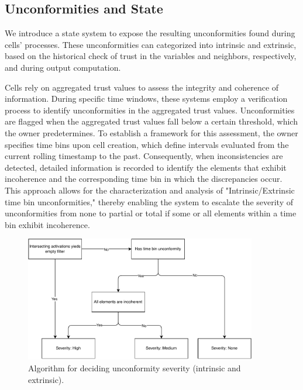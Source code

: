 \subsection{Unconformities and State} \label{sec:states}

We introduce a state system to expose the resulting unconformities found during cells' processes. These unconformities can categorized into intrinsic and extrinsic, based on the historical check of trust in the variables and neighbors, respectively, and during output computation.

Cells rely on aggregated trust values to assess the integrity and coherence of information. During specific time windows, these systems employ a verification process to identify unconformities in the aggregated trust values. Unconformities are flagged when the aggregated trust values fall below a certain threshold, which the owner predetermines. To establish a framework for this assessment, the owner specifies time bins upon cell creation, which define intervals evaluated from the current rolling timestamp to the past. Consequently, when inconsistencies are detected, detailed information is recorded to identify the elements that exhibit incoherence and the corresponding time bin in which the discrepancies occur. This approach allows for the characterization and analysis of "Intrinsic/Extrinsic time bin unconformities," thereby enabling the system to escalate the severity of unconformities from none to partial or total if some or all elements within a time bin exhibit incoherence.

\begin{figure}[h!]
\centering
    \includegraphics[width=0.9\textwidth]{figures/chapter4/cell/states.pdf}
    \caption{Algorithm for deciding unconformity severity (intrinsic and extrinsic).}
    \label{fig:severity}
\end{figure}

